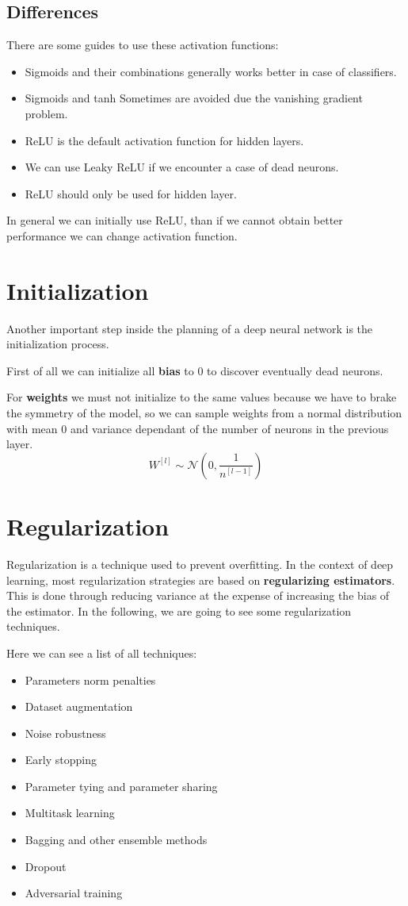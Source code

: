 \subsection{Differences}
There are some guides to use these activation functions:
\begin{itemize}
    \item Sigmoids and their combinations generally works better in case of classifiers.
    \item Sigmoids and tanh Sometimes are avoided due the vanishing gradient problem.
    \item ReLU is the default activation function for hidden layers.
    \item We can use Leaky ReLU if we encounter a case of dead neurons.
    \item ReLU should only be used for hidden layer.
\end{itemize}
In general we can initially use ReLU, than if we cannot obtain better performance
we can change activation function.
\section{Initialization}
Another important step inside the planning of a deep neural network is the
initialization process.

First of all we can initialize all \textbf{bias} to $0$ to discover eventually
dead neurons. %

For \textbf{weights} we must not initialize to the same values because we have to
brake the symmetry of the model, so we can sample weights from a normal
distribution with mean $0$ and variance dependant of the number of neurons in
the previous layer.
\begin{equation*}
    W^{[l]} \sim \mathcal{N}\left(0, \frac{1}{n^{[l-1]}}\right)
\end{equation*}
\section{Regularization}
Regularization is a technique used to prevent overfitting. In the context of
deep learning, most regularization strategies are based on \textbf{regularizing
    estimators}. This is done through reducing variance at the expense of
increasing the bias of the estimator. In the following, we are going to see some
regularization techniques.

Here we can see a list of all techniques:
\begin{itemize}
    \item Parameters norm penalties
    \item Dataset augmentation
    \item Noise robustness
    \item Early stopping
    \item Parameter tying and parameter sharing
    \item Multitask learning
    \item Bagging and other ensemble methods
    \item Dropout
    \item Adversarial training
\end{itemize}

